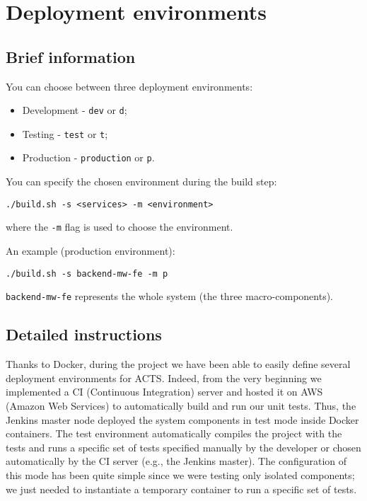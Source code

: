 
\section{Deployment environments}

\subsection{Brief information}

You can choose between three deployment environments:

\begin{itemize}
\item Development - \texttt{dev} or \texttt{d};
\item Testing - \texttt{test} or \texttt{t};
\item Production - \texttt{production} or \texttt{p}.
\end{itemize}

You can specify the chosen environment during the build step:

\begin{lstlisting}
./build.sh -s <services> -m <environment>
\end{lstlisting}

where the \texttt{-m} flag is used to choose the environment.


An example (production environment):

\begin{lstlisting}
./build.sh -s backend-mw-fe -m p
\end{lstlisting}

\texttt{backend-mw-fe} represents the whole system (the three macro-components).


\subsection{Detailed instructions}
Thanks to Docker, during the project we have been able to easily define several
deployment environments for ACTS. Indeed, from the very beginning we implemented a CI (Continuous Integration) server and hosted it
on AWS (Amazon Web Services) to automatically build and run our unit tests.
Thus, the Jenkins master node deployed the
system components in test mode inside Docker containers.
The test environment automatically compiles the project with the tests and
runs a specific set of tests specified manually by the developer or chosen automatically by
the CI server (e.g., the Jenkins master). The configuration of this mode has been quite simple
since we were testing only isolated components;
we just needed to instantiate a temporary
container to run a specific set of tests.


